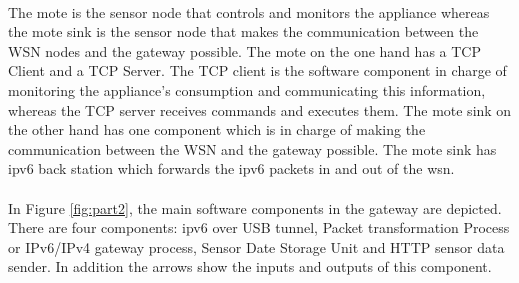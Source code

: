 \documentclass[12pt,a4paper,final]{report}
\begin{document}
\paragraph{}
The mote is the sensor node that controls and monitors the appliance whereas the mote sink is the sensor node that makes the communication between the WSN nodes and the gateway possible. The mote on the one hand has a TCP Client and a TCP Server. The TCP client is the software component in charge of monitoring the appliance's consumption and communicating this information,  whereas the TCP server receives commands and executes them. The mote sink on the other hand has one component which is in charge of making the communication between the WSN and the gateway possible.
The mote sink has \gls{ipv6} back station which forwards the \gls{ipv6} packets in and out of the \gls{wsn}.
 
\paragraph{}
In Figure \ref{fig:part2},  the main software components in the gateway are depicted. There are four components: \gls{ipv6} over USB tunnel, Packet transformation Process or IPv6/IPv4 gateway process, Sensor Date Storage Unit and HTTP sensor data sender. In addition the arrows show the inputs and outputs of this component.
\end{document}
